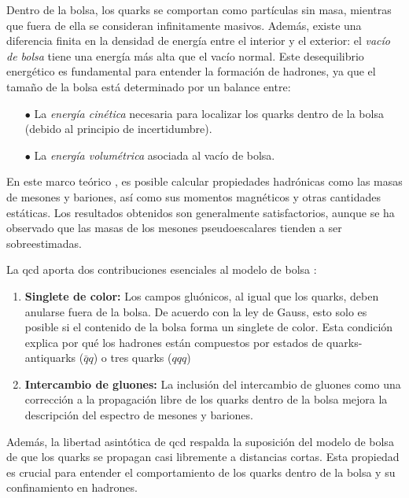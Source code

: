 Dentro de la bolsa, los quarks se comportan como partículas sin masa, mientras que fuera de ella se consideran infinitamente masivos. Además, existe una diferencia finita en la densidad de energía entre el interior y el exterior: el \emph{vacío de bolsa} tiene una energía más alta que el vacío normal. Este desequilibrio energético es fundamental para entender la formación de hadrones, ya que el tamaño de la bolsa está determinado por un balance entre:
\begin{itemize}
    \item[$\bullet$] La \emph{energía cinética} necesaria para localizar los quarks dentro de la bolsa (debido al principio de incertidumbre).
    \item[$\bullet$] La \emph{energía volumétrica} asociada al vacío de bolsa.
\end{itemize}  %

En este marco teórico \cite{Chodos_1974}, es posible calcular propiedades hadrónicas como las masas de mesones y bariones, así como sus momentos magnéticos y otras cantidades estáticas. Los resultados obtenidos son generalmente satisfactorios, aunque se ha observado que las masas de los mesones pseudoescalares tienden a ser sobreestimadas. %

La \gls{qcd} aporta dos contribuciones esenciales al modelo de bolsa \cite{Chodos_1974}:

\begin{enumerate}
\item \textbf{Singlete de color:} Los campos gluónicos, al igual que los quarks, deben anularse fuera de la bolsa. De acuerdo con la ley de Gauss, esto solo es posible si el contenido de la bolsa forma un singlete de color. Esta condición explica por qué los hadrones están compuestos por estados de quarks-antiquarks  ($\bar{q}q$) o tres quarks ($qqq$)
\item \textbf{Intercambio de gluones:} La inclusión del intercambio de gluones como una corrección a la propagación libre de los quarks dentro de la bolsa mejora la descripción del espectro de mesones y bariones.
\end{enumerate}

Además, la libertad asintótica de \gls{qcd} respalda la suposición del modelo de bolsa de que los quarks se propagan casi libremente a distancias cortas. Esta propiedad es crucial para entender el comportamiento de los quarks dentro de la bolsa y su confinamiento en hadrones.

